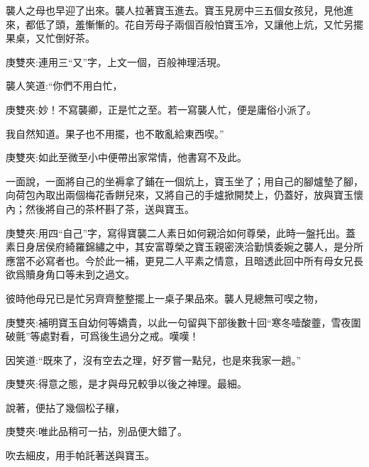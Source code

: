 \begin{parag}
    襲人之母也早迎了出來。襲人拉著寶玉進去。寶玉見房中三五個女孩兒，見他進來，都低了頭，羞慚慚的。花自芳母子兩個百般怕寶玉冷，又讓他上炕，又忙另擺果桌，又忙倒好茶。\begin{note}庚雙夾:連用三“又”字，上文一個，百般神理活現。\end{note}襲人笑道:“你們不用白忙，\begin{note}庚雙夾:妙！不寫襲卿，正是忙之至。若一寫襲人忙，便是庸俗小派了。\end{note}我自然知道。果子也不用擺，也不敢亂給東西喫。”\begin{note}庚雙夾:如此至微至小中便帶出家常情，他書寫不及此。\end{note}一面說，一面將自己的坐褥拿了鋪在一個炕上，寶玉坐了；用自己的腳爐墊了腳，向荷包內取出兩個梅花香餅兒來，又將自己的手爐掀開焚上，仍蓋好，放與寶玉懷內；然後將自己的茶杯斟了茶，送與寶玉。\begin{note}庚雙夾:用四“自己”字，寫得寶襲二人素日如何親洽如何尊榮，此時一盤托出。蓋素日身居侯府綺羅錦繡之中，其安富尊榮之寶玉親密浹洽勤慎委婉之襲人，是分所應當不必寫者也。今於此一補，更見二人平素之情意，且暗透此回中所有母女兄長欲爲贖身角口等未到之過文。\end{note}彼時他母兄已是忙另齊齊整整擺上一桌子果品來。襲人見總無可喫之物，\begin{note}庚雙夾:補明寶玉自幼何等嬌貴，以此一句留與下部後數十回“寒冬噎酸虀，雪夜圍破氈”等處對看，可爲後生過分之戒。嘆嘆！\end{note}因笑道:“既來了，沒有空去之理，好歹嘗一點兒，也是來我家一趟。”\begin{note}庚雙夾:得意之態，是才與母兄較爭以後之神理。最細。\end{note}說著，便拈了幾個松子穰，\begin{note}庚雙夾:唯此品稍可一拈，別品便大錯了。\end{note}吹去細皮，用手帕託著送與寶玉。
\end{parag}


